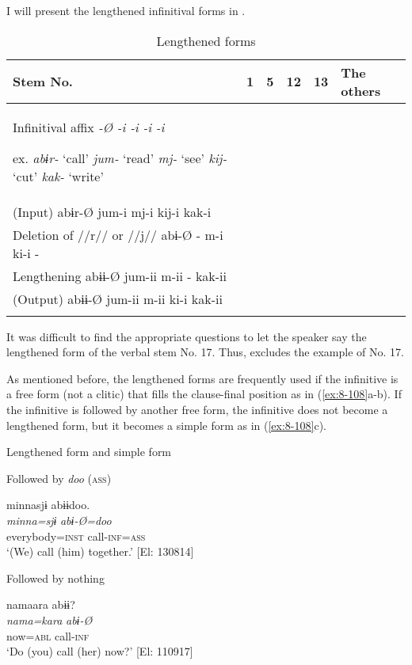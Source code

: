 I will present the lengthened infinitival forms in .

\begin{table}
\caption{\label{tab:key:83}Lengthened forms}

\begin{tabular}{llllll}
\lsptoprule
Stem No. & 1 & 5 & 12 & 13 & The others\\
\midrule
Infinitival affix  \textit{-Ø  -i  -i  -i  -i}

ex.  \textit{abɨr-} ‘call’  \textit{jum-} ‘read’  \textit{mj-} ‘see’  \textit{kij-} ‘cut’  \textit{kak-} ‘write’\\
(Input)  abɨr-Ø  jum-i  mj-i  kij-i  kak-i\\
Deletion of //r// or //j//  abɨ-Ø  -  m-i  ki-i  -\\
Lengthening  abɨɨ-Ø  jum-ii  m-ii  -  kak-ii\\
(Output)  abɨɨ-Ø  jum-ii  m-ii  ki-i  kak-ii\\
\lspbottomrule
\end{tabular}
\end{table}

It was difficult to find the appropriate questions to let the speaker say the lengthened form of the verbal stem No. 17. Thus,  excludes the example of No. 17. 

As mentioned before, the lengthened forms are frequently used if the infinitive is a free form (not a clitic) that fills the clause-final position as in (\ref{ex:8-108}a-b). If the infinitive is followed by another free form, the infinitive does not become a lengthened form, but it becomes a simple form as in (\ref{ex:8-108}c).

\ea\label{ex:8-108}
  Lengthened form and simple form

\ea Followed by \textit{doo} (\textsc{ass})

{\TM}
\glll  minnasjɨ  abɨɨdoo.\\
\textit{minna=sjɨ}  \textit{abɨ-Ø=doo}\\
everybody=\textsc{inst}  call-\textsc{inf}=\textsc{ass}\\
\glt ‘(We) call (him) together.’ [El: 130814]


\ex  Followed by nothing

{\TM}
\glll  namaara  abɨɨ?\\
\textit{nama=kara}  \textit{abɨ-Ø}\\
now=\textsc{abl}  call-\textsc{inf}\\
\glt ‘Do (you) call (her) now?’ [El: 110917]


